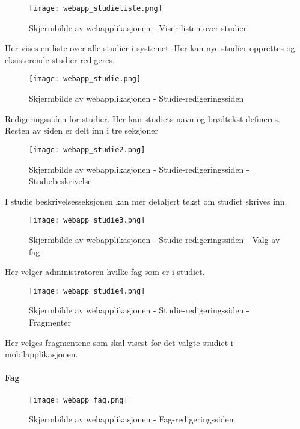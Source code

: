 \documentclass[../main.tex]{subfiles}
\begin{document}
\begin{figure}[H]
  \centering
  \texttt{[image: webapp\_studieliste.png]}
  \caption{Skjermbilde av webapplikasjonen - Viser listen over studier}
\end{figure}

Her vises en liste over alle studier i systemet. Her kan nye studier opprettes og eksisterende studier redigeres.

\begin{figure}[H]
  \centering
  \texttt{[image: webapp\_studie.png]}
  \caption{Skjermbilde av webapplikasjonen - Studie-redigeringssiden}
\end{figure}

Redigeringssiden for studier. Her kan studiets navn og brødtekst defineres. Resten av siden er delt inn i tre seksjoner

\begin{figure}[H]
  \centering
  \texttt{[image: webapp\_studie2.png]}
  \caption{Skjermbilde av webapplikasjonen - Studie-redigeringssiden - Studiebeskrivelse}
\end{figure}

I studie beskrivelsesseksjonen kan mer detaljert tekst om studiet skrives inn.

\begin{figure}[H]
  \centering
  \texttt{[image: webapp\_studie3.png]}
  \caption{Skjermbilde av webapplikasjonen - Studie-redigeringssiden - Valg av fag}
\end{figure}

Her velger administratoren hvilke fag som er i studiet.

\begin{figure}[H]
  \centering
  \texttt{[image: webapp\_studie4.png]}
  \caption{Skjermbilde av webapplikasjonen - Studie-redigeringssiden - Fragmenter}
\end{figure}

Her velges fragmentene som skal visest for det valgte studiet i mobilapplikasjonen.

\paragraph{Fag}

\begin{figure}[H]
  \centering
  \texttt{[image: webapp\_fag.png]}
  \caption{Skjermbilde av webapplikasjonen - Fag-redigeringssiden}
\end{figure}
\end{document}
